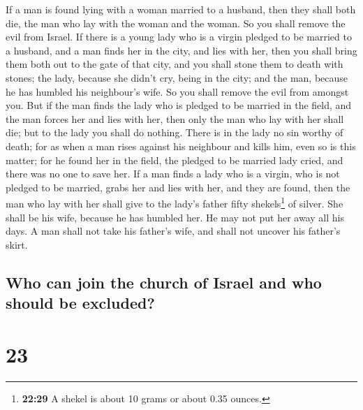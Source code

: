  If a man is found lying with a woman married to a
husband, then they shall both die, the man who lay with the woman and
the woman. So you shall remove the evil from Israel.  If
there is a young lady who is a virgin pledged to be married to a
husband, and a man finds her in the city, and lies with her,
 then you shall bring them both out to the gate of that
city, and you shall stone them to death with stones; the lady, because
she didn't cry, being in the city; and the man, because he has humbled
his neighbour's wife. So you shall remove the evil from amongst you.
 But if the man finds the lady who is pledged to be
married in the field, and the man forces her and lies with her, then
only the man who lay with her shall die;  but to the lady
you shall do nothing. There is in the lady no sin worthy of death; for
as when a man rises against his neighbour and kills him, even so is this
matter;  for he found her in the field, the pledged to be
married lady cried, and there was no one to save her.  If
a man finds a lady who is a virgin, who is not pledged to be married,
grabs her and lies with her, and they are found,  then
the man who lay with her shall give to the lady's father fifty
shekels\footnote{\textbf{22:29} A shekel is about 10 grams or about 0.35
  ounces.} of silver. She shall be his wife, because he has humbled her.
He may not put her away all his days.  A man shall not
take his father's wife, and shall not uncover his father's skirt.

\hypertarget{who-can-join-the-church-of-israel-and-who-should-be-excluded}{%
\subsection{Who can join the church of Israel and who should be
excluded?}\label{who-can-join-the-church-of-israel-and-who-should-be-excluded}}

\hypertarget{section-22}{%
\section{23}\label{section-22}}

